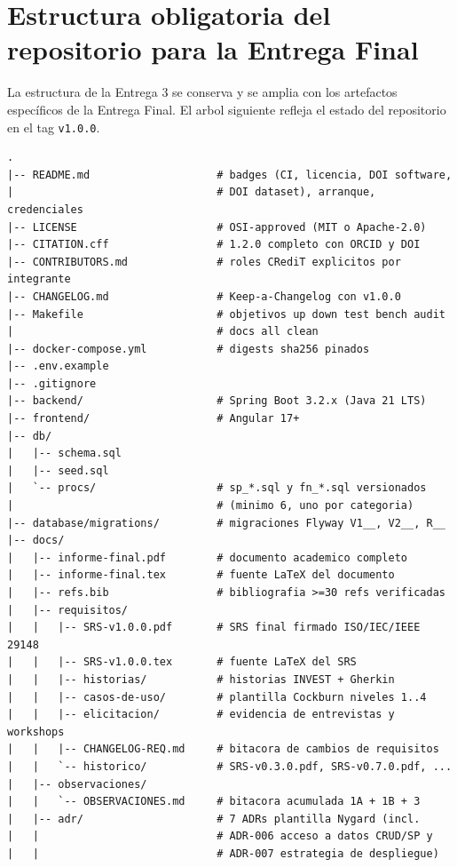 \documentclass[11pt,a4paper]{article}
\begin{document}
\section{Estructura obligatoria del repositorio para la Entrega Final}

La estructura de la Entrega 3 se conserva y se amplia con los artefactos espec\'{i}ficos de la Entrega Final. El arbol siguiente refleja el estado del repositorio en el tag \texttt{v1.0.0}.

\begin{lstlisting}[caption={Estructura minima del repositorio para la Entrega Final}]
.
|-- README.md                    # badges (CI, licencia, DOI software,
|                                # DOI dataset), arranque, credenciales
|-- LICENSE                      # OSI-approved (MIT o Apache-2.0)
|-- CITATION.cff                 # 1.2.0 completo con ORCID y DOI
|-- CONTRIBUTORS.md              # roles CRediT explicitos por integrante
|-- CHANGELOG.md                 # Keep-a-Changelog con v1.0.0
|-- Makefile                     # objetivos up down test bench audit
|                                # docs all clean
|-- docker-compose.yml           # digests sha256 pinados
|-- .env.example
|-- .gitignore
|-- backend/                     # Spring Boot 3.2.x (Java 21 LTS)
|-- frontend/                    # Angular 17+
|-- db/
|   |-- schema.sql
|   |-- seed.sql
|   `-- procs/                   # sp_*.sql y fn_*.sql versionados
|                                # (minimo 6, uno por categoria)
|-- database/migrations/         # migraciones Flyway V1__, V2__, R__
|-- docs/
|   |-- informe-final.pdf        # documento academico completo
|   |-- informe-final.tex        # fuente LaTeX del documento
|   |-- refs.bib                 # bibliografia >=30 refs verificadas
|   |-- requisitos/
|   |   |-- SRS-v1.0.0.pdf       # SRS final firmado ISO/IEC/IEEE 29148
|   |   |-- SRS-v1.0.0.tex       # fuente LaTeX del SRS
|   |   |-- historias/           # historias INVEST + Gherkin
|   |   |-- casos-de-uso/        # plantilla Cockburn niveles 1..4
|   |   |-- elicitacion/         # evidencia de entrevistas y workshops
|   |   |-- CHANGELOG-REQ.md     # bitacora de cambios de requisitos
|   |   `-- historico/           # SRS-v0.3.0.pdf, SRS-v0.7.0.pdf, ...
|   |-- observaciones/
|   |   `-- OBSERVACIONES.md     # bitacora acumulada 1A + 1B + 3
|   |-- adr/                     # 7 ADRs plantilla Nygard (incl.
|   |                            # ADR-006 acceso a datos CRUD/SP y
|   |                            # ADR-007 estrategia de despliegue)

\end{lstlisting}
\end{document}
